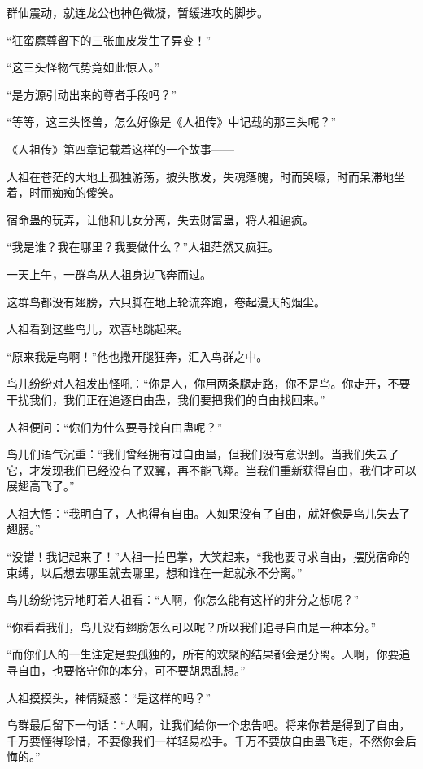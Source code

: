 \begin{this_body}
群仙震动，就连龙公也神色微凝，暂缓进攻的脚步。

“狂蛮魔尊留下的三张血皮发生了异变！”

“这三头怪物气势竟如此惊人。”

“是方源引动出来的尊者手段吗？”

“等等，这三头怪兽，怎么好像是《人祖传》中记载的那三头呢？”

《人祖传》第四章记载着这样的一个故事——

人祖在苍茫的大地上孤独游荡，披头散发，失魂落魄，时而哭嚎，时而呆滞地坐着，时而痴痴的傻笑。

宿命蛊的玩弄，让他和儿女分离，失去财富蛊，将人祖逼疯。

“我是谁？我在哪里？我要做什么？”人祖茫然又疯狂。

一天上午，一群鸟从人祖身边飞奔而过。

这群鸟都没有翅膀，六只脚在地上轮流奔跑，卷起漫天的烟尘。

人祖看到这些鸟儿，欢喜地跳起来。

“原来我是鸟啊！”他也撒开腿狂奔，汇入鸟群之中。

鸟儿纷纷对人祖发出怪吼：“你是人，你用两条腿走路，你不是鸟。你走开，不要干扰我们，我们正在追逐自由蛊，我们要把我们的自由找回来。”

人祖便问：“你们为什么要寻找自由蛊呢？”

鸟儿们语气沉重：“我们曾经拥有过自由蛊，但我们没有意识到。当我们失去了它，才发现我们已经没有了双翼，再不能飞翔。当我们重新获得自由，我们才可以展翅高飞了。”

人祖大悟：“我明白了，人也得有自由。人如果没有了自由，就好像是鸟儿失去了翅膀。”

“没错！我记起来了！”人祖一拍巴掌，大笑起来，“我也要寻求自由，摆脱宿命的束缚，以后想去哪里就去哪里，想和谁在一起就永不分离。”

鸟儿纷纷诧异地盯着人祖看：“人啊，你怎么能有这样的非分之想呢？”

“你看看我们，鸟儿没有翅膀怎么可以呢？所以我们追寻自由是一种本分。”

“而你们人的一生注定是要孤独的，所有的欢聚的结果都会是分离。人啊，你要追寻自由，也要恪守你的本分，可不要胡思乱想。”

人祖摸摸头，神情疑惑：“是这样的吗？”

鸟群最后留下一句话：“人啊，让我们给你一个忠告吧。将来你若是得到了自由，千万要懂得珍惜，不要像我们一样轻易松手。千万不要放自由蛊飞走，不然你会后悔的。”


\end{this_body}
